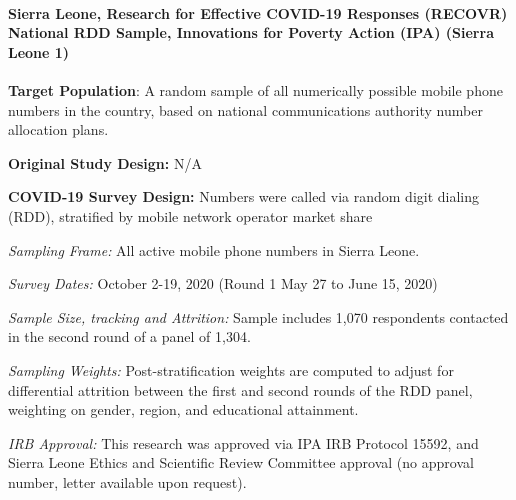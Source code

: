 \documentclass[
  12pt,
]{article}
\begin{document}
\hypertarget{sierra-leone-research-for-effective-covid-19-responses-recovr-national-rdd-sample-innovations-for-poverty-action-ipa-sierra-leone-1}{%
\paragraph*{Sierra Leone, Research for Effective COVID-19 Responses (RECOVR) National RDD Sample, Innovations for Poverty Action (IPA) (Sierra Leone 1)}\label{sierra-leone-research-for-effective-covid-19-responses-recovr-national-rdd-sample-innovations-for-poverty-action-ipa-sierra-leone-1}}

\textbf{Target Population}: A random sample of all numerically possible mobile phone numbers in the country, based on national communications authority number allocation plans.

\textbf{Original Study Design:} N/A

\textbf{COVID-19 Survey Design:} Numbers were called via random digit dialing (RDD), stratified by mobile network operator market share

\emph{Sampling Frame:} All active mobile phone numbers in Sierra Leone.

\emph{Survey Dates:} October 2-19, 2020 (Round 1 May 27 to June 15, 2020)

\emph{Sample Size, tracking and Attrition:} Sample includes 1,070 respondents contacted in the second round of a panel of 1,304.

\emph{Sampling Weights:} Post-stratification weights are computed to adjust for differential attrition between the first and second rounds of the RDD panel, weighting on gender, region, and educational attainment.

\emph{IRB Approval:} This research was approved via IPA IRB Protocol 15592, and Sierra Leone Ethics and Scientific Review Committee approval (no approval number, letter available upon request).
\end{document}
